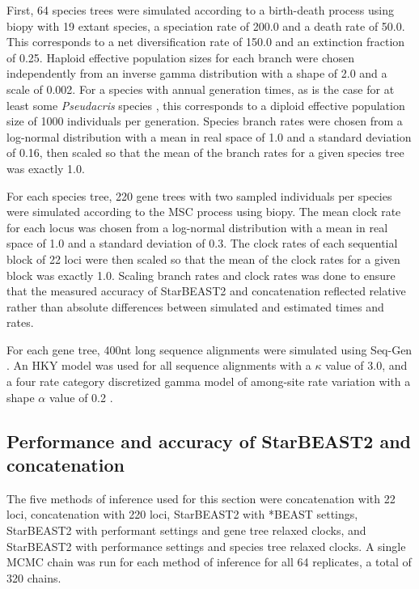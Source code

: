 \documentclass[12pt]{article}
\begin{document}
First, 64 species trees were simulated according to a birth-death process
\citep{Gernhard2008769} using biopy with 19 extant species, a speciation rate of
200.0 and a death rate of 50.0. This corresponds to a net diversification rate
of 150.0 and an extinction fraction of 0.25. Haploid effective population sizes
for each branch were chosen independently from an inverse gamma distribution
with a shape of 2.0 and a scale of 0.002. For a species with annual generation
times, as is the case for at least some \textit{Pseudacris} species
\citep{10.2307/1446044}, this corresponds to a diploid effective population size
of 1000 individuals per generation. Species branch rates were chosen from a
log-normal distribution with a mean in real space of 1.0 and a standard
deviation of 0.16, then scaled so that the mean of the branch rates for a given
species tree was exactly 1.0.

For each species tree, 220 gene trees with two sampled individuals per species
were simulated according to the MSC process using biopy. The
mean clock rate for each locus was chosen from a log-normal distribution with a
mean in real space of 1.0 and a standard deviation of 0.3. The clock rates of
each sequential block of 22 loci were then scaled so that the mean of the clock
rates for a given block was exactly 1.0. Scaling branch rates and clock rates
was done to ensure that the measured accuracy of StarBEAST2 and concatenation reflected
relative rather than absolute differences between simulated and estimated times
and rates.

For each gene tree, 400nt long sequence alignments were simulated using Seq-Gen
\citep{Rambaut01061997}. An HKY model was used for all sequence alignments with
a $\kappa$ value of 3.0, and a four rate category discretized gamma model
of among-site rate variation with a shape $\alpha$ value of 0.2
\citep{Yang1994}.

\subsection*{Performance and accuracy of StarBEAST2 and concatenation}

The five methods of inference used for this section were concatenation with 22
loci, concatenation with 220 loci, StarBEAST2 with *BEAST settings, StarBEAST2
with performant settings and gene tree relaxed clocks, and StarBEAST2 with
performance settings and species tree relaxed clocks. A single MCMC chain was
run for each method of inference for all 64 replicates, a total of 320 chains.
\end{document}

